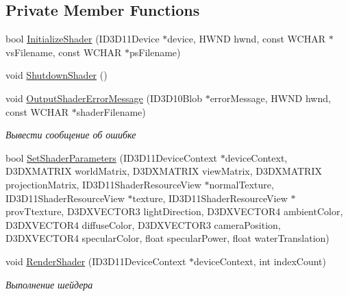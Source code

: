 \subsection*{Private Member Functions}
\begin{DoxyCompactItemize}
\item 
bool \hyperlink{class_water_shader_class_a178a4d3718c02b2510ece50b3aa4e4ce}{Initialize\+Shader} (I\+D3\+D11\+Device $\ast$device, H\+W\+ND hwnd, const W\+C\+H\+AR $\ast$vs\+Filename, const W\+C\+H\+AR $\ast$ps\+Filename)
\item 
void \hyperlink{class_water_shader_class_aa5ca07656d368b2a5d072b4e595e5de6}{Shutdown\+Shader} ()
\item 
void \hyperlink{class_water_shader_class_a11dcba661864c46fa5625523fdfa9e21}{Output\+Shader\+Error\+Message} (I\+D3\+D10\+Blob $\ast$error\+Message, H\+W\+ND hwnd, const W\+C\+H\+AR $\ast$shader\+Filename)
\begin{DoxyCompactList}\small\item\em Вывести сообщение об ошибке \end{DoxyCompactList}\item 
bool \hyperlink{class_water_shader_class_ac1ca39ffa8b014edac595d7feb2d7cad}{Set\+Shader\+Parameters} (I\+D3\+D11\+Device\+Context $\ast$device\+Context, D3\+D\+X\+M\+A\+T\+R\+IX world\+Matrix, D3\+D\+X\+M\+A\+T\+R\+IX view\+Matrix, D3\+D\+X\+M\+A\+T\+R\+IX projection\+Matrix, I\+D3\+D11\+Shader\+Resource\+View $\ast$normal\+Texture, I\+D3\+D11\+Shader\+Resource\+View $\ast$texture, I\+D3\+D11\+Shader\+Resource\+View $\ast$prov\+Ttexture, D3\+D\+X\+V\+E\+C\+T\+O\+R3 light\+Direction, D3\+D\+X\+V\+E\+C\+T\+O\+R4 ambient\+Color, D3\+D\+X\+V\+E\+C\+T\+O\+R4 diffuse\+Color, D3\+D\+X\+V\+E\+C\+T\+O\+R3 camera\+Position, D3\+D\+X\+V\+E\+C\+T\+O\+R4 specular\+Color, float specular\+Power, float water\+Translation)
\item 
void \hyperlink{class_water_shader_class_a14344728215443fc201f195ec6da032e}{Render\+Shader} (I\+D3\+D11\+Device\+Context $\ast$device\+Context, int index\+Count)
\begin{DoxyCompactList}\small\item\em Выполнение шейдера \end{DoxyCompactList}\end{DoxyCompactItemize}
